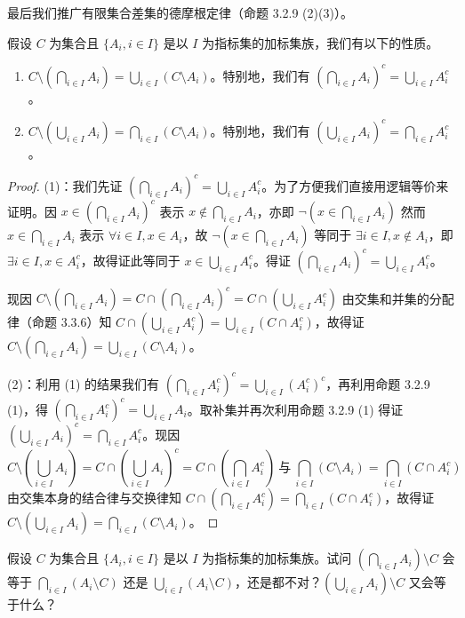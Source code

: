 最后我们推广有限集合差集的德摩根定律（命题 3.2.9 (2)(3)）。

\begin{proposition}
假设 $C$ 为集合且 $\{A_i, i \in I\}$ 是以 $I$ 为指标集的加标集族，我们有以下的性质。
\begin{enumerate}
  \item $C \setminus (\bigcap_{i \in I} A_i) = \bigcup_{i \in I} (C \setminus A_i)$。特别地，我们有 $(\bigcap_{i \in I} A_i)^c = \bigcup_{i \in I} A_i^c$。
  \item $C \setminus (\bigcup_{i \in I} A_i) = \bigcap_{i \in I} (C \setminus A_i)$。特别地，我们有 $(\bigcup_{i \in I} A_i)^c = \bigcap_{i \in I} A_i^c$。
\end{enumerate}
\end{proposition}

\begin{proof}
(1)：我们先证 $(\bigcap_{i \in I} A_i)^c = \bigcup_{i \in I} A_i^c$。为了方便我们直接用逻辑等价来证明。因 $x \in (\bigcap_{i \in I} A_i)^c$ 表示 $x \notin \bigcap_{i \in I} A_i$，亦即 $\neg(x \in \bigcap_{i \in I} A_i)$ 然而 $x \in \bigcap_{i \in I} A_i$ 表示 $\forall i \in I, x \in A_i$，故 $\neg(x \in \bigcap_{i \in I} A_i)$ 等同于 $\exists i \in I, x \notin A_i$，即 $\exists i \in I, x \in A_i^c$，故得证此等同于 $x \in \bigcup_{i \in I} A_i^c$。得证 $(\bigcap_{i \in I} A_i)^c = \bigcup_{i \in I} A_i^c$。

现因 $C \setminus (\bigcap_{i \in I} A_i) = C \cap (\bigcap_{i \in I} A_i)^c = C \cap (\bigcup_{i \in I} A_i^c)$ 由交集和并集的分配律（命题 3.3.6）知 $C \cap (\bigcup_{i \in I} A_i^c) = \bigcup_{i \in I} (C \cap A_i^c)$，故得证 $C \setminus (\bigcap_{i \in I} A_i) = \bigcup_{i \in I} (C \setminus A_i)$。

(2)：利用 (1) 的结果我们有 $(\bigcap_{i \in I} A_i^c)^c = \bigcup_{i \in I} (A_i^c)^c$，再利用命题 3.2.9 (1)，得 $(\bigcap_{i \in I} A_i^c)^c = \bigcup_{i \in I} A_i$。取补集并再次利用命题 3.2.9 (1) 得证 $(\bigcup_{i \in I} A_i)^c = \bigcap_{i \in I} A_i^c$。现因
\[C \setminus (\bigcup_{i \in I} A_i) = C \cap (\bigcup_{i \in I} A_i)^c = C \cap (\bigcap_{i \in I} A_i^c)~\text{与}~\bigcap_{i \in I} (C\setminus A_i) = \bigcap_{i \in I} (C\cap A_i^c)\] 由交集本身的结合律与交换律知 $C \cap (\bigcap_{i \in I} A_i^c) = \bigcap_{i \in I} (C \cap A_i^c)$，故得证 $C \setminus (\bigcup_{i \in I} A_i) = \bigcap_{i \in I} (C \setminus A_i)$。
\end{proof}

\begin{question}
假设 $C$ 为集合且 $\{A_i, i \in I\}$ 是以 $I$ 为指标集的加标集族。试问 $(\bigcap_{i \in I} A_i) \setminus C$ 会等于 $\bigcap_{i \in I} (A_i \setminus C)$ 还是 $\bigcup_{i \in I} (A_i \setminus C)$，还是都不对？$(\bigcup_{i \in I} A_i) \setminus C$ 又会等于什么？
\end{question}

